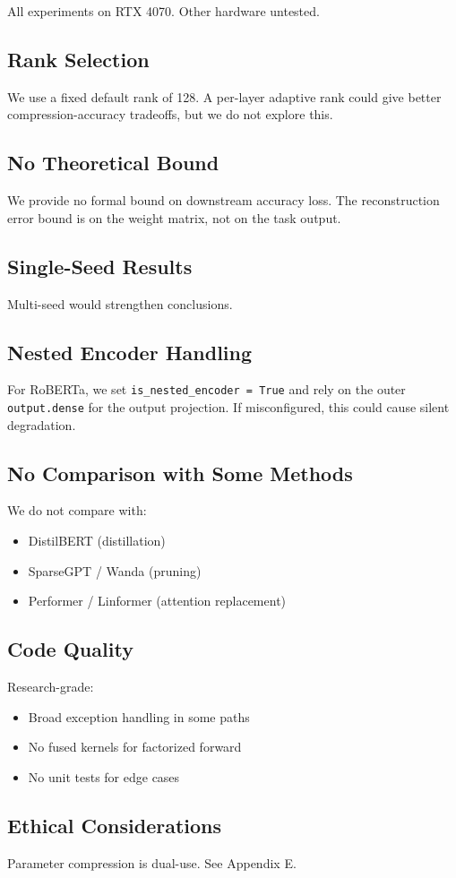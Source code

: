 All experiments on RTX 4070. Other hardware untested.

\subsection{Rank Selection}

We use a fixed default rank of 128. A per-layer adaptive rank could give 
better compression-accuracy tradeoffs, but we do not explore this.

\subsection{No Theoretical Bound}

We provide no formal bound on downstream accuracy loss. The reconstruction 
error bound is on the weight matrix, not on the task output.

\subsection{Single-Seed Results}

Multi-seed would strengthen conclusions.

\subsection{Nested Encoder Handling}

For RoBERTa, we set \texttt{is\_nested\_encoder = True} and rely on the outer 
\texttt{output.dense} for the output projection. If misconfigured, this could 
cause silent degradation.

\subsection{No Comparison with Some Methods}

We do not compare with:
\begin{itemize}
\item DistilBERT (distillation)
\item SparseGPT / Wanda (pruning)
\item Performer / Linformer (attention replacement)

\end{itemize}
\subsection{Code Quality}

Research-grade:
\begin{itemize}
\item Broad exception handling in some paths
\item No fused kernels for factorized forward
\item No unit tests for edge cases

\end{itemize}
\subsection{Ethical Considerations}

Parameter compression is dual-use. See Appendix E.

